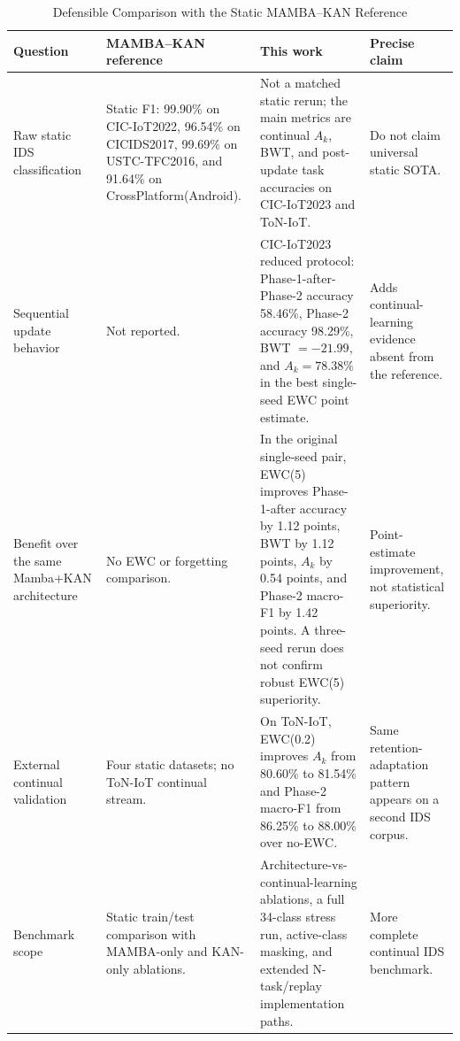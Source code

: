 \documentclass[a4paper,fleqn]{cas-dc}
\begin{document}
\begin{table}[htbp]
\caption{Defensible Comparison with the Static MAMBA--KAN Reference}
\label{tab:prior-context}
\centering
\small
\begin{tabular}{p{}p{}p{}p{}}
\toprule
Question & MAMBA--KAN reference~\cite{zhao2025} & This work & Precise claim \\
\midrule
Raw static IDS classification & Static F1: 99.90\% on CIC-IoT2022, 96.54\% on CICIDS2017, 99.69\% on USTC-TFC2016, and 91.64\% on CrossPlatform(Android). & Not a matched static rerun; the main metrics are continual $A_k$, BWT, and post-update task accuracies on CIC-IoT2023 and ToN-IoT. & Do not claim universal static SOTA. \\
Sequential update behavior & Not reported. & CIC-IoT2023 reduced protocol: Phase-1-after-Phase-2 accuracy 58.46\%, Phase-2 accuracy 98.29\%, BWT $=-21.99$, and $A_k=78.38\%$ in the best single-seed EWC point estimate. & Adds continual-learning evidence absent from the reference. \\
Benefit over the same Mamba+KAN architecture & No EWC or forgetting comparison. & In the original single-seed pair, EWC(5) improves Phase-1-after accuracy by 1.12 points, BWT by 1.12 points, $A_k$ by 0.54 points, and Phase-2 macro-F1 by 1.42 points. A three-seed rerun does not confirm robust EWC(5) superiority. & Point-estimate improvement, not statistical superiority. \\
External continual validation & Four static datasets; no ToN-IoT continual stream. & On ToN-IoT, EWC(0.2) improves $A_k$ from 80.60\% to 81.54\% and Phase-2 macro-F1 from 86.25\% to 88.00\% over no-EWC. & Same retention-adaptation pattern appears on a second IDS corpus. \\
Benchmark scope & Static train/test comparison with MAMBA-only and KAN-only ablations. & Architecture-vs-continual-learning ablations, a full 34-class stress run, active-class masking, and extended N-task/replay implementation paths. & More complete continual IDS benchmark. \\
\bottomrule
\end{tabular}
\end{table}
\end{document}
